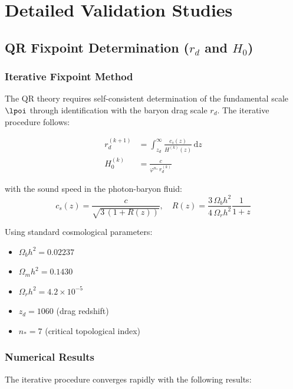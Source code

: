 \section{Detailed Validation Studies}
\label{appendix:validations}

\subsection{QR Fixpoint Determination ($r_d$ and $H_0$)}
\label{subsec:fixpoint-validation}

\subsubsection{Iterative Fixpoint Method}
\label{subsubsec:fixpoint-method}

The QR theory requires self-consistent determination of the fundamental scale $\lpoi$ through identification with the baryon drag scale $r_d$. The iterative procedure follows:

\begin{align}
r_d^{(k+1)} &= \int_{z_d}^{\infty} \frac{c_s(z)}{H^{(k)}(z)}\,\mathrm{d}z \\
H_0^{(k)} &= \frac{c}{\varphi^{n_\ast}\, r_d^{(k)}}
\end{align}

with the sound speed in the photon-baryon fluid:
\begin{equation}
c_s(z) = \frac{c}{\sqrt{3\,(1+R(z))}}, \quad R(z) = \frac{3\,\Omega_b h^2}{4\,\Omega_r h^2}\frac{1}{1+z}
\end{equation}

Using standard cosmological parameters:
\begin{itemize}
\item $\Omega_b h^2 = 0.02237$
\item $\Omega_m h^2 = 0.1430$ 
\item $\Omega_r h^2 = 4.2 \times 10^{-5}$
\item $z_d = 1060$ (drag redshift)
\item $n_\ast = 7$ (critical topological index)
\end{itemize}

\subsubsection{Numerical Results}
\label{subsubsec:fixpoint-results}

The iterative procedure converges rapidly with the following results:

